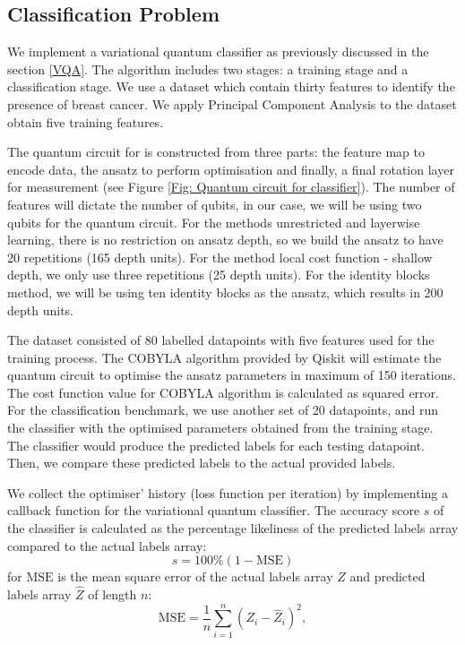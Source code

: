 \subsection{Classification Problem} \label{Sec: Classification Problem}
We implement a variational quantum classifier as previously discussed in the section \ref{VQA}.
The algorithm includes two stages: a training stage and a classification stage.
We use a dataset which contain thirty features to identify the presence of breast cancer.
We apply Principal Component Analysis to the dataset obtain five training features.

The quantum circuit for is constructed from three parts: the feature map to encode data, the ansatz to perform optimisation and finally, a final rotation layer for measurement (see Figure \ref{Fig: Quantum circuit for classifier}).
The number of features will dictate the number of qubits, in our case, we will be using two qubits for the quantum circuit.
For the methods unrestricted and layerwise learning, there is no restriction on ansatz depth, so we build the ansatz to have 20 repetitions (165 depth units).
For the method local cost function - shallow depth, we only use three repetitions (25 depth units).
For the identity blocks method, we will be using ten identity blocks as the ansatz, which results in 200 depth units.

The dataset consisted of 80 labelled datapoints with five features used for the training process.
The COBYLA algorithm provided by Qiskit will estimate the quantum circuit to optimise the ansatz parameters in maximum of 150 iterations.
The cost function value for COBYLA algorithm is calculated as squared error.
For the classification benchmark, we use another set of 20 datapoints, and run the classifier with the optimised parameters obtained from the training stage.
The classifier would produce the predicted labels for each testing datapoint.
Then, we compare these predicted labels to the actual provided labels.

We collect the optimiser' history (loss function per iteration) by implementing a callback function for the variational quantum classifier.
The accuracy score $s$ of the classifier is calculated as the percentage likeliness of the predicted labels array compared to the actual labels array:
\begin{equation}
    s = 100\% (1 - \text{MSE})
\end{equation}
for $\text{MSE}$ is the mean square error of the actual labels array $Z$ and predicted labels array $\hat{Z}$ of length $n$:
\begin{equation}
    \text{MSE} = \frac{1}{n}\sum^n_{i=1}(Z_i - \hat{Z}_i)^2,
\end{equation}




